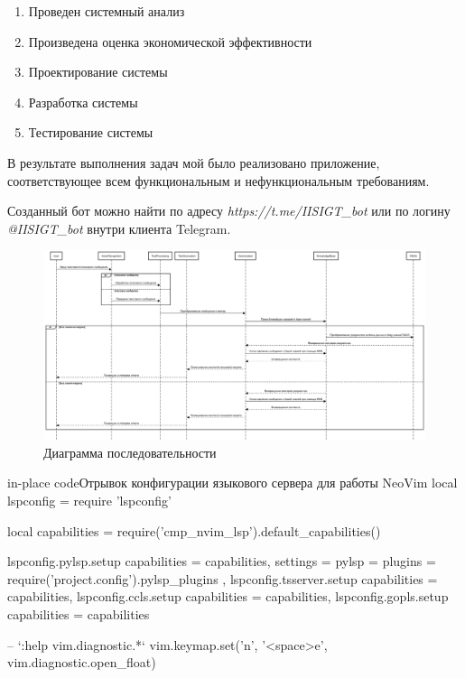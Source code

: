 \begin{enumerate}
    \item Проведен системный анализ
    \item Произведена оценка экономической эффективности
    \item Проектирование системы
    \item Разработка системы
    \item Тестирование системы
\end{enumerate}

В результате выполнения
задач мой было реализовано приложение, соответствующее всем функциональным и
нефункциональным требованиям.

Созданный бот можно найти по адресу \emph{https://t.me/IISIGT\_bot} или по логину 
\emph{@IISIGT\_bot} внутри клиента Telegram.

\showbib


\begin{figure}[H]
    \centering
    \includegraphics[width=1.2\textwidth, angle=90]{Диаграмма последовательности.png}
    \caption{Диаграмма последовательности}\label{Диаграмма последовательности.png}
\end{figure}


\begin{codepiece}{in-place code}{Отрывок конфигурации языкового сервера для работы NeoVim}
local lspconfig = require 'lspconfig'

local capabilities = require('cmp_nvim_lsp').default_capabilities()

lspconfig.pylsp.setup {
  capabilities = capabilities,
  settings = { pylsp = { plugins = require('project.config').pylsp_plugins } },
}
lspconfig.tsserver.setup {
  capabilities = capabilities,
}
lspconfig.ccls.setup {
  capabilities = capabilities,
}
lspconfig.gopls.setup {
  capabilities = capabilities
}

-- `:help vim.diagnostic.*`
vim.keymap.set('n', '<space>e', vim.diagnostic.open_float)
\end{codepiece}

